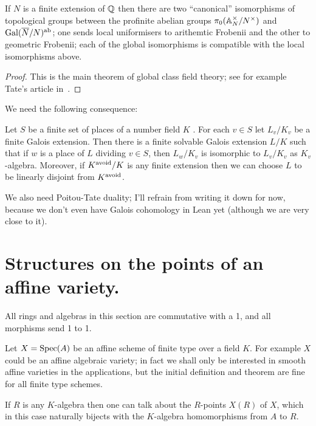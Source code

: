 \begin{theorem}\label{global_class_field_theory}\notready If $N$ is a finite extension of $\mathbb{Q}$ then there are two ``canonical'' isomorphisms of topological groups between the profinite abelian groups $\pi_0(\mathbb{A}_N^\times/N^\times)$ and $\operatorname{Gal}(\overline{N}/N)^{\operatorname{ab}}$; one sends local uniformisers to arithemtic Frobenii and the other to geometric Frobenii; each of the global isomorphisms is compatible with the local isomorphisms above.
\end{theorem}
\begin{proof}\notready This is the main theorem of global class field theory; see for example Tate's article in~\cite{cf}.
\end{proof}

We need the following consequence:

\begin{theorem}\label{Skinner_Wiles_CFT_trick}\notready Let $S$ be a finite set of places of a number field $K$ . For each $v \in S$
let $L_v/K_v$ be a finite Galois extension. Then there is a finite solvable Galois extension
$L/K$ such that if $w$ is a place of $L$ dividing $v \in S$, then $L_w/K_v$ is isomorphic to $L_v/K_v$ as $K_v$-algebra. Moreover, if $K^{\operatorname{avoid}} /K$ is
any finite extension then we can choose $L$ to be linearly disjoint from $K^{\operatorname{avoid}}$.
\end{theorem}

We also need Poitou-Tate duality; I'll refrain from writing it down for now, because we don't even have Galois cohomology in Lean yet (although we are very close to it).

\section{Structures on the points of an affine variety.}

All rings and algebras in this section are commutative with a 1, and all morphisms send 1 to 1.

Let $X=\operatorname{Spec}(A)$ be an affine scheme of finite type over a field $K$. For example $X$ could be an affine algebraic variety; in fact we shall only be interested in smooth affine varieties in the applications, but the initial definition and theorem are fine for all finite type schemes.

If $R$ is any $K$-algebra then one can talk about the $R$-points $X(R)$ of $X$, which in this case
naturally bijects with the $K$-algebra homomorphisms from $A$ to $R$.

